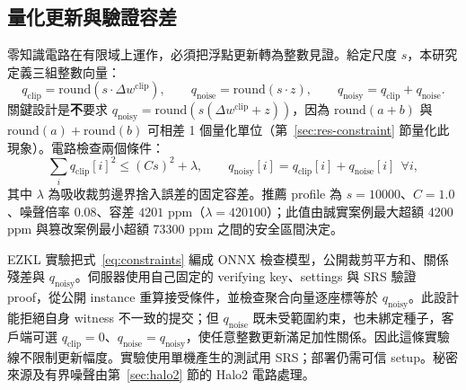 \documentclass[12pt,a4paper]{article}
\newcommand{\qclip}{q_{\mathrm{clip}}}
\newcommand{\qnoise}{q_{\mathrm{noise}}}
\newcommand{\qnoisy}{q_{\mathrm{noisy}}}
\begin{document}
\subsection{量化更新與驗證容差}
\label{sec:canonical}
零知識電路在有限域上運作，必須把浮點更新轉為整數見證。給定尺度 $s$，本研究定義三組整數向量：
\begin{equation}
\qclip=\mathrm{round}(s\cdot\Delta w^{\mathrm{clip}}),\qquad
\qnoise=\mathrm{round}(s\cdot z),\qquad
\qnoisy=\qclip+\qnoise .
\end{equation}
關鍵設計是\textbf{不}要求 $\qnoisy=\mathrm{round}(s(\Delta w^{\mathrm{clip}}+z))$，因為 $\mathrm{round}(a+b)$ 與 $\mathrm{round}(a)+\mathrm{round}(b)$ 可相差 1 個量化單位（第~\ref{sec:res-constraint} 節量化此現象）。電路檢查兩個條件：
\begin{equation}
\sum_i \qclip[i]^2 \le (Cs)^2+\lambda,\qquad \qnoisy[i]=\qclip[i]+\qnoise[i]\ \ \forall i,
\label{eq:constraints}
\end{equation}
其中 $\lambda$ 為吸收裁剪邊界捨入誤差的固定容差。推薦 profile 為 $s=10000$、$C=1.0$、噪聲倍率 $0.08$、容差 $4201$ ppm（$\lambda=420100$）；此值由誠實案例最大超額 4200 ppm 與篡改案例最小超額 73300 ppm 之間的安全區間決定。

EZKL 實驗把式~\eqref{eq:constraints} 編成 ONNX 檢查模型，公開裁剪平方和、關係殘差與 $\qnoisy$。伺服器使用自己固定的 verifying key、settings 與 SRS 驗證 proof，從公開 instance 重算接受條件，並檢查聚合向量逐座標等於 $\qnoisy$。此設計能拒絕自身 witness 不一致的提交；但 $\qnoise$ 既未受範圍約束，也未綁定種子，客戶端可選 $\qclip=0$、$\qnoise=\qnoisy$，使任意整數更新滿足加性關係。因此這條實驗線不限制更新幅度。實驗使用單機產生的測試用 SRS；部署仍需可信 setup。秘密來源及有界噪聲由第~\ref{sec:halo2} 節的 Halo2 電路處理。
\end{document}
